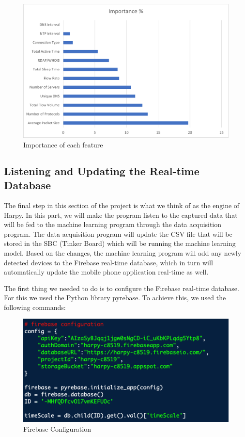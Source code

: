 \documentclass{article}
\begin{document}
\begin{figure}[!ht]
    \centering
    \includegraphics[width=13cm]{ML2graphs/importancechart.png}
    \caption{Importance of each feature} 
\end{figure}

\subsection{Listening and Updating the Real-time Database}

The final step in this section of the project is what we think of as the engine of Harpy. In this part, we will make the program listen to the captured data that will be fed to the machine learning program through the data acquisition program. The data acquisition program will update the CSV file that will be stored in the SBC (Tinker Board) which will be running the machine learning model. Based on the changes, the machine learning program will add any newly detected devices to the Firebase real-time database, which in turn will automatically update the mobile phone application real-time as well. \newline

The first thing we needed to do is to configure the Firebase real-time database. For this we used the Python library pyrebase. To achieve this, we used the following commands:\newline 

\begin{figure}[!ht]
    \centering
    \includegraphics[scale=0.75]{ML2graphs/firebaseconfig.png}
    \caption{Firebase Configuration} 
\end{figure}
\end{document}
